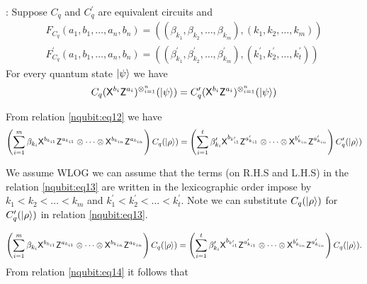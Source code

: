 : Suppose $C_q$ and $C_q^\prime$ are equivalent circuits and
\begin{equation*}
\begin{aligned}
F_{C_q}(a_1,b_1,\ldots,a_n,b_n)= ((\beta_{k_1}, \beta_{k_2},\ldots, \beta_{k_m}),(k_1,k_2,\ldots, k_m)) \\
F_{C_q}^\prime(a_1,b_1,\ldots,a_n,b_n)= ((\beta_{k_1}^\prime, \beta_{k_2}^\prime,\ldots, \beta_{k_m}^\prime),(k_1^\prime,k_2^\prime,\ldots, k_t^\prime))
\end{aligned}
\end{equation*}
For every quantum state ${\lvert}\psi\rangle$ we have
\begin{equation}
\label{nqubit:eq12}
\begin{aligned}
C_q ({\sf X}^{b_i}{\sf Z}^{a_i})^{\otimes_{i=1}^n}({\lvert}\psi\rangle)=C_q^\prime ({\sf X}^{b_i}{\sf Z}^{a_i})^{\otimes_{i=1}^n}({\lvert}\psi\rangle)
\end{aligned}
\end{equation}

From relation \ref{nqubit:eq12} we have
\begin{equation}
\label{nqubit:eq13}
\begin{aligned}
\left(\sum_{i=1}^m \beta_{k_i} {\sf X}^{b_{k_{i1}}} {\sf Z}^{a_{k_{i1}}} \otimes \cdots  \otimes {\sf X}^{b_{k_{in}}} {\sf Z}^{a_{k_{in}}}\right) C_q ({\lvert}\rho\rangle)=\left(\sum_{i=1}^t \beta_{k_i}^\prime {\sf X}^{b_{k_{i1}^\prime}} {\sf Z}^{a_{k_{i1}}^\prime} \otimes \cdots  \otimes {\sf X}^{b_{k_{in}}^\prime} {\sf Z}^{a_{k_{in}}^\prime}\right)C_q^\prime ({\lvert}\rho\rangle)
\end{aligned}
\end{equation}

We assume WLOG we can assume that the terms (on R.H.S and L.H.S) in the relation \ref{nqubit:eq13} are written in the lexicographic order impose by  $k_1<k_2<\ldots <k_m$ and $k_1^\prime<k_2^\prime<\ldots <k_t^\prime.$ Note we can substitute  $C_q({\lvert}\rho\rangle)$ for $C_q^\prime ({\lvert}\rho\rangle)$ in relation \ref{nqubit:eq13}.

\begin{equation}
\label{nqubit:eq14}
\begin{aligned}
\left(\sum_{i=1}^m \beta_{k_i} {\sf X}^{b_{k_{i1}}} {\sf Z}^{a_{k_{i1}}} \otimes \cdots  \otimes {\sf X}^{b_{k_{in}}} {\sf Z}^{a_{k_{in}}}\right) C_q ({\lvert}\rho\rangle)=\left(\sum_{i=1}^t \beta_{k_i}^\prime {\sf X}^{b_{k_{i1}^\prime}} {\sf Z}^{a_{k_{i1}}^\prime} \otimes \cdots  \otimes {\sf X}^{b_{k_{in}}^\prime} {\sf Z}^{a_{k_{in}}^\prime}\right)C_q ({\lvert}\rho\rangle).
\end{aligned}
\end{equation}
From relation \ref{nqubit:eq14} it follows that

